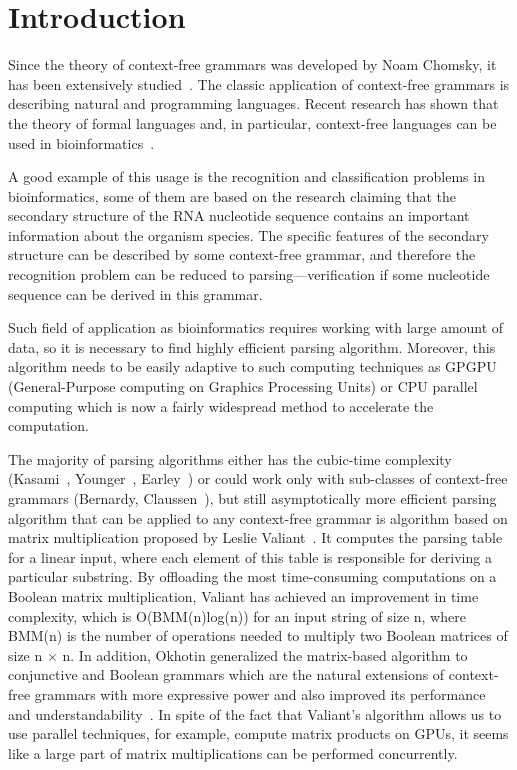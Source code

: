 \section{Introduction}

Since the theory of context-free grammars was developed by Noam Chomsky, it has been extensively studied~\cite{chomsky1959certain,chomsky1963algebraic}. 
The classic application of context-free grammars is describing natural and programming  languages. 
Recent  research has  shown  that the theory of formal languages and, in particular, context-free languages can be used in bioinformatics~\cite{rivas,knudsen,yuan,dowell}.

A good example of this usage is the recognition and classification problems in bioinformatics, some of them are based on the research claiming that the secondary structure of the RNA nucleotide sequence contains an important information about the organism species. The specific features of the secondary structure can be described by some context-free grammar, and therefore the recognition problem can be reduced to parsing---verification if some nucleotide sequence can be derived in this grammar.

Such field of application as bioinformatics requires working with large amount of data, so it is necessary to find highly efficient parsing algorithm. 
Moreover, this algorithm needs to be easily adaptive to such computing techniques as GPGPU (General-Purpose computing on Graphics Processing Units) or CPU parallel computing which is now a fairly widespread method to accelerate the computation.

The majority of parsing algorithms either has the cubic-time complexity (Kasami~\cite{Kas}, Younger~\cite{Younger:1966:CLP:1441427.1442019}, Earley~\cite{Earley:1970:ECP:362007.362035}) or could work only with sub-classes of context-free grammars (Bernardy, Claussen~\cite{Bernardy:2013:EDP:2544174.2500576}), but still asymptotically more efficient parsing algorithm that can be applied to any context-free grammar is algorithm based on matrix multiplication proposed by Leslie Valiant~\cite{Valiant:1975:GCR:1739932.1740048}. It computes the parsing table for a linear input, where each element of this table is responsible for deriving a particular substring. By offloading the most time-consuming computations on a Boolean matrix multiplication, Valiant has achieved an improvement in time complexity, which is O(BMM(n)log(n)) for an input string of size n, where BMM(n) is the number of operations needed to multiply two Boolean matrices of size n $\times$ n. In addition, Okhotin generalized the matrix-based algorithm to conjunctive and Boolean grammars which are the natural extensions of context-free grammars with more expressive power and also improved its performance and understandability~\cite{Okhotin:2014:PMM:2565359.2565379}. In spite of the fact that Valiant's algorithm allows us to use parallel techniques, for example, compute matrix products on GPUs, it seems like a large part of matrix multiplications can be performed concurrently.

